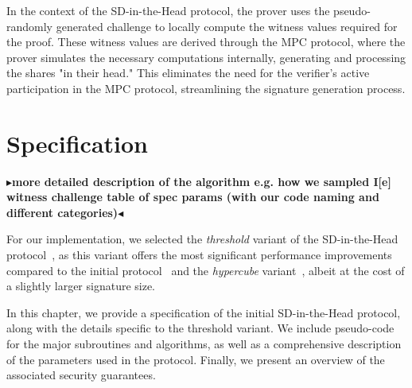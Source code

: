 \documentclass[twoside,11pt]{report}
\theoremstyle{definition}
\theoremstyle{plain}
\newcommand{\todo}[1]{{\color[rgb]{.5,0,0}\textbf{$\blacktriangleright$#1$\blacktriangleleft$}}}
\begin{document}
In the context of the SD-in-the-Head protocol, the prover uses the pseudo-randomly generated challenge to locally compute the witness values required for the proof. These witness values are derived through the MPC protocol, where the prover simulates the necessary computations internally, generating and processing the shares "in their head." This eliminates the need for the verifier's active participation in the MPC protocol, streamlining the signature generation process.


\chapter{Specification}\label{ch:spec}

\todo{more detailed description of the algorithm
  e.g. how we sampled I[e] witness challenge
  table of spec params (with our code naming and different categories)}

For our implementation, we selected the \textit{threshold} variant of the SD-in-the-Head protocol~\cite{aguilarsyndrome11,feneuil2023threshold}, as this variant offers the most significant performance improvements compared to the initial protocol~\cite{feneuil2022syndrome} and the \textit{hypercube} variant~\cite{aguilarsyndrome11,aguilar2023return}, albeit at the cost of a slightly larger signature size.

In this chapter, we provide a specification of the initial SD-in-the-Head protocol, along with the details specific to the threshold variant. We include pseudo-code for the major subroutines and algorithms, as well as a comprehensive description of the parameters used in the protocol. Finally, we present an overview of the associated security guarantees.
\end{document}
